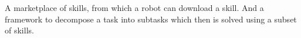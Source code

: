 A marketplace of skills, from which a robot can download a skill. And a framework to decompose a task into subtasks which then is solved using a subset of skills. 

